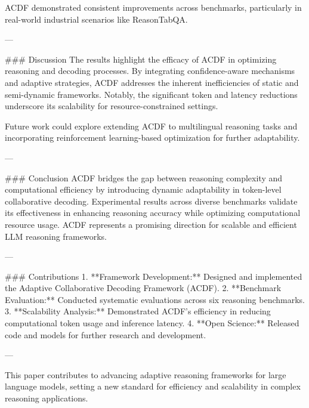 ACDF demonstrated consistent improvements across benchmarks, particularly in real-world industrial scenarios like ReasonTabQA.  

---

### Discussion  
The results highlight the efficacy of ACDF in optimizing reasoning and decoding processes. By integrating confidence-aware mechanisms and adaptive strategies, ACDF addresses the inherent inefficiencies of static and semi-dynamic frameworks. Notably, the significant token and latency reductions underscore its scalability for resource-constrained settings.  

Future work could explore extending ACDF to multilingual reasoning tasks and incorporating reinforcement learning-based optimization for further adaptability.  

---

### Conclusion  
ACDF bridges the gap between reasoning complexity and computational efficiency by introducing dynamic adaptability in token-level collaborative decoding. Experimental results across diverse benchmarks validate its effectiveness in enhancing reasoning accuracy while optimizing computational resource usage. ACDF represents a promising direction for scalable and efficient LLM reasoning frameworks.  

---

### Contributions  
1. **Framework Development:** Designed and implemented the Adaptive Collaborative Decoding Framework (ACDF).  
2. **Benchmark Evaluation:** Conducted systematic evaluations across six reasoning benchmarks.  
3. **Scalability Analysis:** Demonstrated ACDF’s efficiency in reducing computational token usage and inference latency.  
4. **Open Science:** Released code and models for further research and development.  

--- 

This paper contributes to advancing adaptive reasoning frameworks for large language models, setting a new standard for efficiency and scalability in complex reasoning applications.